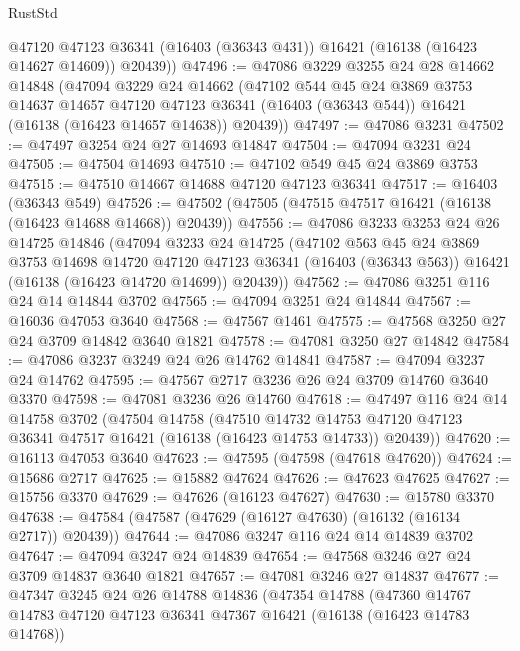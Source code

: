 \begin{lexlean}{RustStd}
\begin{coremodule}
        @47120
        @47123
        @36341
        (@16403 (@36343 @431))
        @16421
        (@16138 (@16423 @14627 @14609))
        @20439))
@47496 := @47086
    @3229
    @3255
    @24
    @28
    @14662
    @14848
    (@47094
      @3229
      @24
      @14662
      (@47102
        @544
        @45
        @24
        @3869
        @3753
        @14637
        @14657
        @47120
        @47123
        @36341
        (@16403 (@36343 @544))
        @16421
        (@16138 (@16423 @14657 @14638))
        @20439))
@47497 := @47086 @3231
@47502 := @47497 @3254 @24 @27 @14693 @14847
@47504 := @47094 @3231 @24
@47505 := @47504 @14693
@47510 := @47102 @549 @45 @24 @3869 @3753
@47515 := @47510 @14667 @14688 @47120 @47123 @36341
@47517 := @16403 (@36343 @549)
@47526 := @47502 (@47505 (@47515 @47517 @16421 (@16138 (@16423 @14688 @14668)) @20439))
@47556 := @47086
    @3233
    @3253
    @24
    @26
    @14725
    @14846
    (@47094
      @3233
      @24
      @14725
      (@47102
        @563
        @45
        @24
        @3869
        @3753
        @14698
        @14720
        @47120
        @47123
        @36341
        (@16403 (@36343 @563))
        @16421
        (@16138 (@16423 @14720 @14699))
        @20439))
@47562 := @47086 @3251 @116 @24 @14 @14844 @3702
@47565 := @47094 @3251 @24 @14844
@47567 := @16036 @47053 @3640
@47568 := @47567 @1461
@47575 := @47568 @3250 @27 @24 @3709 @14842 @3640 @1821
@47578 := @47081 @3250 @27 @14842
@47584 := @47086 @3237 @3249 @24 @26 @14762 @14841
@47587 := @47094 @3237 @24 @14762
@47595 := @47567 @2717 @3236 @26 @24 @3709 @14760 @3640 @3370
@47598 := @47081 @3236 @26 @14760
@47618 := @47497
    @116
    @24
    @14
    @14758
    @3702
    (@47504
      @14758
      (@47510
        @14732
        @14753
        @47120
        @47123
        @36341
        @47517
        @16421
        (@16138 (@16423 @14753 @14733))
        @20439))
@47620 := @16113 @47053 @3640
@47623 := @47595 (@47598 (@47618 @47620))
@47624 := @15686 @2717
@47625 := @15882 @47624
@47626 := @47623 @47625
@47627 := @15756 @3370
@47629 := @47626 (@16123 @47627)
@47630 := @15780 @3370
@47638 := @47584 (@47587 (@47629 (@16127 @47630) (@16132 (@16134 @2717)) @20439))
@47644 := @47086 @3247 @116 @24 @14 @14839 @3702
@47647 := @47094 @3247 @24 @14839
@47654 := @47568 @3246 @27 @24 @3709 @14837 @3640 @1821
@47657 := @47081 @3246 @27 @14837
@47677 := @47347
    @3245
    @24
    @26
    @14788
    @14836
    (@47354
      @14788
      (@47360
        @14767
        @14783
        @47120
        @47123
        @36341
        @47367
        @16421
        (@16138 (@16423 @14783 @14768))

\end{coremodule}
\end{lexlean}
